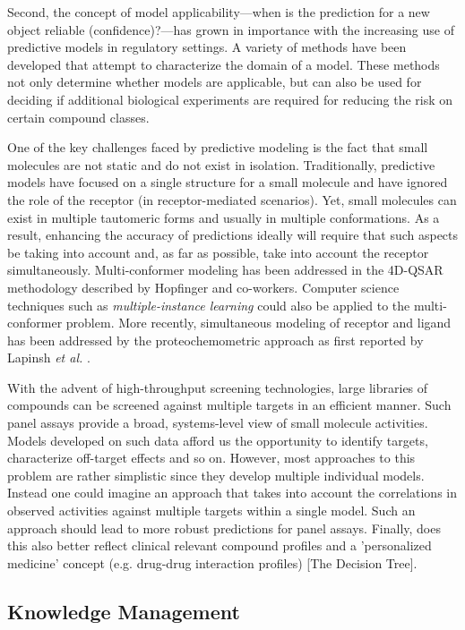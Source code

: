 \documentclass{sig-alternate}
\begin{document}
Second, the concept of model applicability---when is the prediction
for a new object reliable (confidence)?---has grown in importance with
the increasing use of predictive models in regulatory settings. A
variety of methods have been developed that attempt to characterize
the domain of a model. These methods not only determine whether models
are applicable, but can also be used for deciding if additional
biological experiments are required for reducing the risk on certain
compound classes.

One of the key challenges faced by predictive modeling is the fact
that small molecules are not static and do not exist in
isolation. Traditionally, predictive models have focused on a single
structure for a small molecule and have ignored the role of the
receptor (in receptor-mediated scenarios). Yet, small molecules can
exist in multiple tautomeric forms and usually in multiple
conformations. As a result, enhancing the accuracy of predictions
ideally will require that such aspects be taking into account and, as
far as possible, take into account the receptor
simultaneously. Multi-conformer modeling has been addressed in the
4D-QSAR methodology described by Hopfinger and co-workers.  Computer
science techniques such as \emph{multiple-instance learning} could
also be applied to the multi-conformer problem. More recently,
simultaneous modeling of receptor and ligand has been addressed by the
proteochemometric approach as first reported by Lapinsh
\textit{et al.} \cite{lapinsh2001}.

With the advent of high-throughput screening technologies, large libraries of
compounds can be screened against multiple targets in an efficient manner. Such
panel assays provide a broad, systems-level view of small molecule activities.
Models developed on such data afford us the opportunity to identify targets,
characterize off-target effects and so on. However, most approaches to this
problem are rather simplistic since they develop multiple individual models.
Instead one could imagine an approach that takes into account the correlations
in observed activities against multiple targets within a single model. Such an
approach should lead to more robust predictions for panel assays. Finally, does
this also better reflect clinical relevant compound profiles \cite{kuhn2010}
and a 'personalized medicine' concept (e.g. drug-drug interaction profiles) [The
Decision Tree].

\subsection{Knowledge Management}
\label{sec:knowledge-management}
\end{document}
